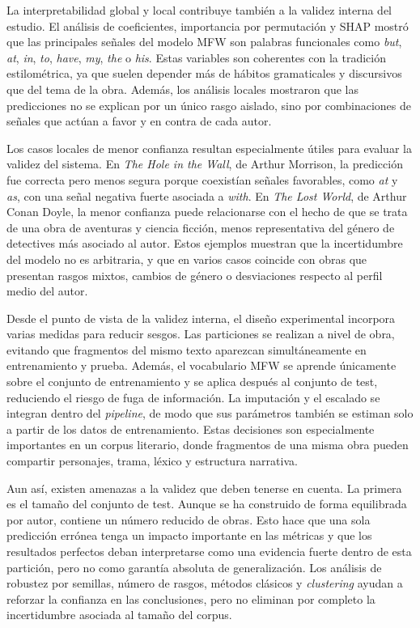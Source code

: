 \documentclass[IB]{TFUOC}%
\begin{document}
La interpretabilidad global y local contribuye también a la validez interna del estudio. El análisis de coeficientes, importancia por permutación y SHAP mostró que las principales señales del modelo MFW son palabras funcionales como \textit{but}, \textit{at}, \textit{in}, \textit{to}, \textit{have}, \textit{my}, \textit{the} o \textit{his}. Estas variables son coherentes con la tradición estilométrica, ya que suelen depender más de hábitos gramaticales y discursivos que del tema de la obra. Además, los análisis locales mostraron que las predicciones no se explican por un único rasgo aislado, sino por combinaciones de señales que actúan a favor y en contra de cada autor.

Los casos locales de menor confianza resultan especialmente útiles para evaluar la validez del sistema. En \textit{The Hole in the Wall}, de Arthur Morrison, la predicción fue correcta pero menos segura porque coexistían señales favorables, como \textit{at} y \textit{as}, con una señal negativa fuerte asociada a \textit{with}. En \textit{The Lost World}, de Arthur Conan Doyle, la menor confianza puede relacionarse con el hecho de que se trata de una obra de aventuras y ciencia ficción, menos representativa del género de detectives más asociado al autor. Estos ejemplos muestran que la incertidumbre del modelo no es arbitraria, y que en varios casos coincide con obras que presentan rasgos mixtos, cambios de género o desviaciones respecto al perfil medio del autor.

Desde el punto de vista de la validez interna, el diseño experimental incorpora varias medidas para reducir sesgos. Las particiones se realizan a nivel de obra, evitando que fragmentos del mismo texto aparezcan simultáneamente en entrenamiento y prueba. Además, el vocabulario MFW se aprende únicamente sobre el conjunto de entrenamiento y se aplica después al conjunto de test, reduciendo el riesgo de fuga de información. La imputación y el escalado se integran dentro del \textit{pipeline}, de modo que sus parámetros también se estiman solo a partir de los datos de entrenamiento. Estas decisiones son especialmente importantes en un corpus literario, donde fragmentos de una misma obra pueden compartir personajes, trama, léxico y estructura narrativa.

Aun así, existen amenazas a la validez que deben tenerse en cuenta. La primera es el tamaño del conjunto de test. Aunque se ha construido de forma equilibrada por autor, contiene un número reducido de obras. Esto hace que una sola predicción errónea tenga un impacto importante en las métricas y que los resultados perfectos deban interpretarse como una evidencia fuerte dentro de esta partición, pero no como garantía absoluta de generalización. Los análisis de robustez por semillas, número de rasgos, métodos clásicos y \textit{clustering} ayudan a reforzar la confianza en las conclusiones, pero no eliminan por completo la incertidumbre asociada al tamaño del corpus.
\end{document}
